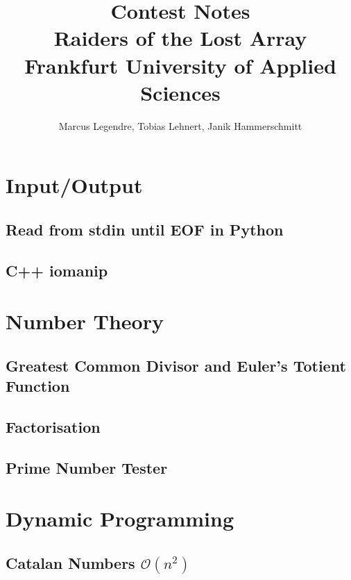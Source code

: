 \documentclass[11pt]{article}
\title{Contest Notes\\Raiders of the Lost Array\\Frankfurt University of Applied Sciences}
\author{Marcus Legendre, Tobias Lehnert, Janik Hammerschmitt}
\date{}
\begin{document}
\maketitle

\tableofcontents


\section{Input/Output}

\subsection{Read from stdin until EOF in Python}


\subsection{C++ iomanip}


\section{Number Theory}

\subsection{Greatest Common Divisor and Euler's Totient Function}


\subsection{Factorisation}


\subsection{Prime Number Tester}



\section{Dynamic Programming}

\subsection{Catalan Numbers $\mathcal{O}(n^2)$}

\end{document}
